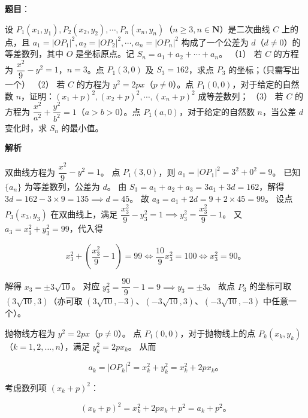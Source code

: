 \begin{answer}

\textbf{题目}：

设 $P_1(x_1, y_1), P_2(x_2, y_2), \cdots, P_n(x_n, y_n)$（$n \geqslant 3, n \in \mathbf{N}$）是二次曲线 $C$ 上的点，且 $a_1 = |OP_1|^2, a_2 = |OP_2|^2, \cdots, a_n = |OP_n|^2$ 构成了一个公差为 $d$（$d \ne 0$）的等差数列，其中 $O$ 是坐标原点。记 $S_n = a_1 + a_2 + \cdots + a_n$。
（1） 若 $C$ 的方程为 $\dfrac{x^2}{9} - y^2 = 1$，$n = 3$。点 $P_1(3, 0)$ 及 $S_3 = 162$，求点 $P_3$ 的坐标；（只需写出一个）
（2） 若 $C$ 的方程为 $y^2 = 2px$（$p \ne 0$）。点 $P_1(0, 0)$，对于给定的自然数 $n$，证明：$(x_1 + p)^2, (x_2 + p)^2, \cdots, (x_n + p)^2$ 成等差数列；
（3） 若 $C$ 的方程为 $\dfrac{x^2}{a^2} + \dfrac{y^2}{b^2} = 1$（$a > b > 0$）。点 $P_1(a, 0)$，对于给定的自然数 $n$，当公差 $d$ 变化时，求 $S_n$ 的最小值。

\textbf{解析}


双曲线方程为 $\dfrac{x^2}{9} - y^2 = 1$。
点 $P_1(3, 0)$，则 $a_1 = |OP_1|^2 = 3^2 + 0^2 = 9$。
已知 $\{a_n\}$ 为等差数列，公差为 $d$。
由 $S_3 = a_1 + a_2 + a_3 = 3a_1 + 3d = 162$，解得 $3d = 162 - 3 \times 9 = 135 \implies d = 45$。
故 $a_3 = a_1 + 2d = 9 + 2 \times 45 = 99$。
设点 $P_3(x_3, y_3)$ 在双曲线上，满足 $\dfrac{x_3^2}{9} - y_3^2 = 1 \implies y_3^2 = \dfrac{x_3^2}{9} - 1$。
又 $a_3 = x_3^2 + y_3^2 = 99$，代入得

\nopagebreak[4]
\[
x_3^2 + \left(\dfrac{x_3^2}{9} - 1\right) = 99 \iff \dfrac{10}{9}x_3^2 = 100 \iff x_3^2 = 90\mbox{。}
\]

解得 $x_3 = \pm 3\sqrt{10}$。
对应 $y_3^2 = \dfrac{90}{9} - 1 = 9 \implies y_3 = \pm 3$。
故点 $P_3$ 的坐标可取 $(3\sqrt{10}, 3)$（亦可取 $(3\sqrt{10}, -3)$、$(-3\sqrt{10}, 3)$、$(-3\sqrt{10}, -3)$ 中任意一个）。


抛物线方程为 $y^2 = 2px$（$p \ne 0$）。
点 $P_1(0, 0)$，对于抛物线上的点 $P_k(x_k, y_k)$（$k = 1, 2, \dots, n$），满足 $y_k^2 = 2px_k$。
从而

\nopagebreak[4]
\[
a_k = |OP_k|^2 = x_k^2 + y_k^2 = x_k^2 + 2px_k\mbox{。}
\]

考虑数列项 $(x_k + p)^2$：

\nopagebreak[4]
\[
(x_k + p)^2 = x_k^2 + 2px_k + p^2 = a_k + p^2\mbox{。}
\]


\end{answer}
